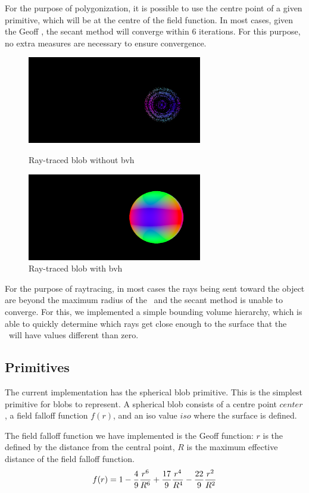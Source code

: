 \documentclass[conference]{acmsiggraph}
\begin{document}
For the purpose of polygonization, it is possible to use the centre point of a
given primitive, which will be at the centre of the field function. In most
cases, given the Geoff \fff, the secant method will converge within 6
iterations. For this purpose, no extra measures are necessary to ensure
convergence.

\begin{figure}[htb]
	\centering
	\includegraphics[height=1.5in] {images/sphere_no_bvh.png}
	\caption{Ray-traced blob without bvh}
	\includegraphics[height=1.5in] {images/sphere_bvh.png}
	\caption{Ray-traced blob with bvh}
\end{figure}

For the purpose of raytracing, in most cases the rays being sent toward the
object are beyond the maximum radius of the \fff\ and the secant method is
unable to converge. For this, we implemented a simple bounding volume
hierarchy, which is able to quickly determine which rays get close enough to
the surface that the \fff\ will have values different than zero.

\subsection{Primitives}
The current implementation has the spherical blob primitive. This is the
simplest primitive for blobs to represent. A spherical blob consists of a
centre point $center$, a field falloff function $f(r)$, and an iso value
$iso$ where the surface is defined.

The field falloff function we have implemented is the Geoff function: $r$ is
the defined by the distance from the central point, $R$ is the maximum
effective distance of the field falloff function.
\begin{equation}
f(r) = 1 - {4\over9} {r^6 \over R^6} + {17 \over 9} {r^4 \over R ^ 4} -
{22\over 9} {r^2 \over R^2}
\label{eq:GeoffFunction}
\end{equation}
\end{document}
